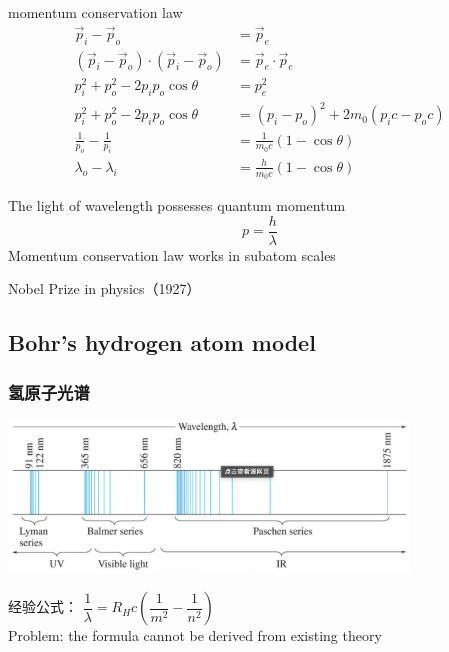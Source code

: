 \begin{frame}  
    momentum conservation law
    \begin{equation*}
        \begin{split}
            \vec{p}_i -\vec{p}_o &= \vec{p}_e \\
            (\vec{p}_i -\vec{p}_o)\cdot (\vec{p}_i -\vec{p}_o)  &= \vec{p}_e\cdot \vec{p}_e   \\
            p_i ^2 + p_o ^2 -2p_i p_o \cos \theta &= p_e ^2  \\
            p_i ^2 + p_o ^2 -2p_i p_o \cos \theta &= (p_i-p_o)^2 +2 m_0 (p_i c-p_o c) \\
            \frac{1}{p_o} -\frac{1}{p_i} &= \frac{1}{m_0 c} (1-\cos \theta) \\
            \lambda_o -\lambda_i &= \frac{h}{m_0 c} (1-\cos \theta) 
        \end{split}
    \end{equation*}
\end{frame}

\begin{frame}   
    \begin{tcolorbox}[colback=yellow!10,colframe=red!75!black,title=Significance]
        \bullet The light of wavelength \lambda possesses quantum momentum \[p=\frac{h}{\lambda}\]
        \bullet Momentum conservation law works in subatom scales 
    \end{tcolorbox}   
    {\color{deepred} Nobel Prize in physics（1927）}\\
\end{frame}

\subsection{Bohr's hydrogen atom model}
\begin{frame}  
     \frametitle{氢原子光谱}
     \begin{center}
        \includegraphics[width=0.8\textwidth]{figs/hydspe.png}
    \end{center}  
    经验公式：
       $\dfrac{1}{\lambda}=R_H c (\dfrac{1}{m^2} -\dfrac{1}{n^2})$ \\
    \alert{Problem:} the formula cannot be derived from existing theory
\end{frame}

